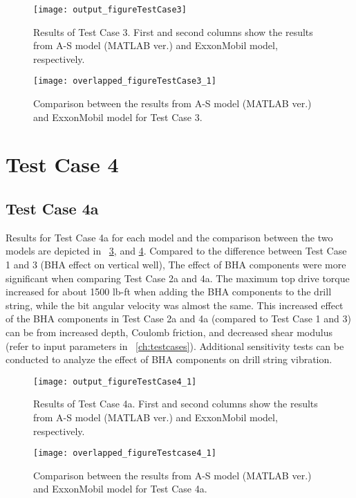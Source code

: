 \begin{figure}
  \centering
  \texttt{[image: output\_figureTestCase3]}
  \caption[Results of Test Case 3]{Results of Test Case 3. First and second columns show the results from A-S model (MATLAB ver.) and ExxonMobil model, respectively.}\label{figure_testcase3}
\end{figure}
\begin{figure}
  \centering
  \texttt{[image: overlapped\_figureTestCase3\_1]}
  \caption[Comparison of the results for Test Case 3]{Comparison between the results from A-S model (MATLAB ver.) and ExxonMobil model for Test Case 3.}\label{figure_testcase3_overlapped}
\end{figure}

\section{Test Case 4}
\subsection{Test Case 4a}
Results for Test Case 4a for each model and the comparison between the two models are depicted in \figurename~\ref{figure_testcase4_1}, and \ref{figure_testCase4_1_overlapped}. Compared to the difference between Test Case 1 and 3 (BHA effect on vertical well), The effect of BHA components were more significant when comparing Test Case 2a and 4a. The maximum top drive torque increased for about 1500 lb-ft when adding the BHA components to the drill string, while the bit angular velocity was almost the same. This increased effect of the BHA components in Test Case 2a and 4a (compared to Test Case 1 and 3) can be from increased depth, Coulomb friction, and decreased shear modulus (refer to input parameters in \chaptername~\ref{ch:testcases}). Additional sensitivity tests can be conducted to analyze the effect of BHA components on drill string vibration. 

\begin{figure}
  \centering
  \texttt{[image: output\_figureTestCase4\_1]}
  \caption[Results of Test Case 4a]{Results of Test Case 4a. First and second columns show the results from A-S model (MATLAB ver.) and ExxonMobil model, respectively.}\label{figure_testcase4_1}
\end{figure}

\begin{figure}
  \centering
  \texttt{[image: overlapped\_figureTestcase4\_1]}
  \caption[Comparison of the results for Test Case 4a]{Comparison between the results from A-S model (MATLAB ver.) and ExxonMobil model for Test Case 4a.}\label{figure_testCase4_1_overlapped}
\end{figure}



